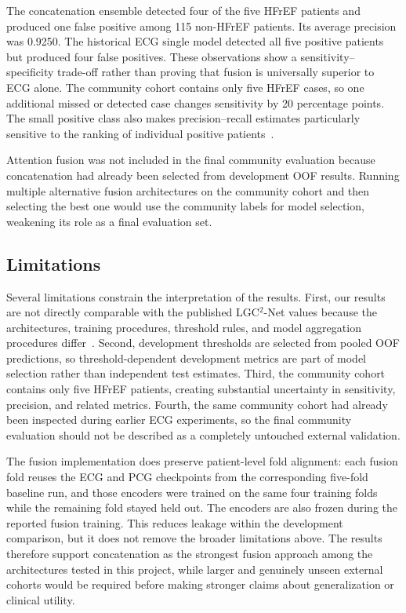 \documentclass[11pt,a4paper]{article}
\begin{document}
The concatenation ensemble detected four of the five HFrEF patients and
produced one false positive among 115 non-HFrEF patients. Its average precision
was 0.9250. The historical ECG single model detected all five positive patients
but produced four false positives. These observations show a sensitivity--
specificity trade-off rather than proving that fusion is universally superior
to ECG alone. The community cohort contains only five HFrEF cases, so one
additional missed or detected case changes sensitivity by 20 percentage
points. The small positive class also makes precision--recall estimates
particularly sensitive to the ranking of individual positive
patients~\cite{saito2015pr}.

Attention fusion was not included in the final community evaluation because
concatenation had already been selected from development OOF results. Running
multiple alternative fusion architectures on the community cohort and then
selecting the best one would use the community labels for model selection,
weakening its role as a final evaluation set.

\subsection{Limitations}

Several limitations constrain the interpretation of the results. First, our
results are not directly comparable with the published LGC$^{2}$-Net values
because the architectures, training procedures, threshold rules, and model
aggregation procedures differ~\cite{ma2026hierarchical,lgc2implementation}.
Second, development thresholds are selected from pooled OOF predictions, so
threshold-dependent development metrics are part of model selection rather
than independent test estimates. Third, the community cohort contains only
five HFrEF patients, creating substantial uncertainty in sensitivity,
precision, and related metrics. Fourth, the same community cohort had already
been inspected during earlier ECG experiments, so the final community
evaluation should not be described as a completely untouched external
validation.

The fusion implementation does preserve patient-level fold alignment: each
fusion fold reuses the ECG and PCG checkpoints from the corresponding
five-fold baseline run, and those encoders were trained on the same four
training folds while the remaining fold stayed held out. The encoders are also
frozen during the reported fusion training. This reduces leakage within the
development comparison, but it does not remove the broader limitations above.
The results therefore support concatenation as the strongest fusion approach
among the architectures tested in this project, while larger and genuinely
unseen external cohorts would be required before making stronger claims about
generalization or clinical utility.
\end{document}
